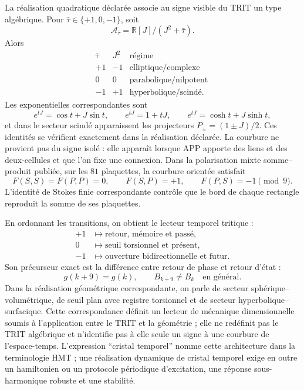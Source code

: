 La réalisation quadratique déclarée associe au signe visible du TRIT un type
algébrique. Pour
\(\bar\tau\in\{+1,0,-1\}\), soit
\[
 \mathcal A_{\bar\tau}=
 \mathbb R[J]/(J^2+\bar\tau).
\]
Alors
\[
 \begin{array}{c|c|c}
 \bar\tau&J^2&\text{régime}\ \\ \hline
 +1&-1&\text{elliptique/complexe}\ \\
 0&0&\text{parabolique/nilpotent}\ \\
 -1&+1&\text{hyperbolique/scindé}.
 \end{array}
\]
Les exponentielles correspondantes sont
\[
 e^{tJ}=\cos t+J\sin t,
 \qquad e^{tJ}=1+tJ,
 \qquad e^{tJ}=\cosh t+J\sinh t,
\]
et dans le secteur scindé apparaissent les projecteurs
\(P_\pm=(1\pm J)/2\). Ces identités se vérifient exactement dans la
réalisation déclarée. La
courbure ne provient pas du signe isolé : elle apparaît lorsque APP apporte des liens et
des deux-cellules et que l'on fixe une connexion. Dans la polarisation mixte somme--produit
publiée, sur les \(81\) plaquettes, la courbure orientée satisfait
\[
 F(S,S)=F(P,P)=0,
 \qquad F(S,P)=+1,
 \qquad F(P,S)=-1\pmod9.
\]
L'identité de Stokes finie correspondante contrôle que le bord de chaque
rectangle reproduit la somme de ses plaquettes.

En ordonnant les transitions, on obtient le lecteur temporel tritique :
\[
 \begin{aligned}
 +1&\longmapsto\text{retour, mémoire et passé},\\
  0&\longmapsto\text{seuil torsionnel et présent},\\
 -1&\longmapsto\text{ouverture bidirectionnelle et futur}.
 \end{aligned}
\]
Son précurseur exact est la différence entre retour de phase et retour
d'état :
\[
 g(k+9)=g(k),
 \qquad B_{k+9}\neq B_k\quad\text{en général}.
\]
Dans la réalisation géométrique correspondante, on parle de secteur
sphérique--volumétrique, de seuil plan avec registre torsionnel et de secteur
hyperbolique--surfacique. Cette correspondance définit un lecteur de mécanique
dimensionnelle soumis à l'application entre le TRIT et la géométrie ; elle ne redéfinit pas le TRIT
algébrique et n'identifie pas à elle seule
un signe à une courbure de l'espace-temps. L'expression ``cristal
temporel'' nomme cette architecture dans la terminologie HMT ; une réalisation
dynamique de cristal temporel exige en outre un hamiltonien ou un protocole
périodique d'excitation,
une réponse sous-harmonique robuste et une stabilité.

